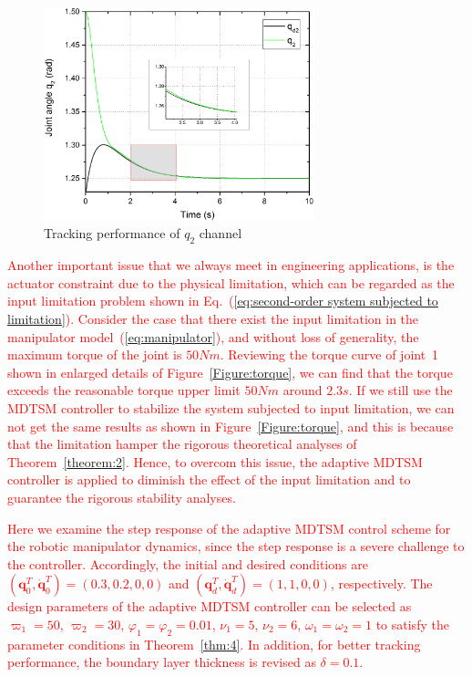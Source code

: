 \documentclass[3p]{elsarticle}
\theoremstyle{plain}
\theoremstyle{remark}
\begin{document}
\begin{figure}
\centering
\includegraphics[width=0.7\textwidth]{paper3_fig7.eps}
\caption{Tracking performance of $q_2$ channel}
\label{Figure:7}
\end{figure}
\textcolor{red}{Another important issue that we always meet in engineering applications, is the actuator constraint due to the physical limitation, which can be regarded as the input limitation problem shown in Eq.~(\ref{eq:second-order system subjected to limitation}). Consider the case that there exist the input limitation in the manipulator model~(\ref{eq:manipulator}), and without loss of generality, the maximum torque of the joint is $50Nm$. Reviewing the torque curve of joint~1  shown in enlarged details of  Figure~\ref{Figure:torque}, we can find that the torque exceeds the reasonable torque upper limit $50Nm$ around $2.3s$. If we still use the MDTSM controller to stabilize the system subjected to input limitation, we can not get the same results as shown in Figure~\ref{Figure:torque}, and this is because that the limitation hamper the rigorous theoretical analyses of Theorem~\ref{theorem:2}. Hence, to overcom this issue, the adaptive MDTSM controller is applied to diminish the effect of the input limitation and to guarantee the rigorous stability analyses.}

\textcolor{red}{Here we examine the step response of the adaptive MDTSM control scheme for the robotic manipulator dynamics, since the step response is a severe challenge to the controller. Accordingly, the initial and desired conditions are $(\bm q_0^T, \dot{\bm q}_0^T)= (0.3,0.2,0,0)$ and $({\bm q}_d^T,\dot{\bm q}_d^T)=(1,1,0,0)$, respectively. The design parameters of the adaptive MDTSM controller can be selected as $\varpi_1=50$, $\varpi_2=30$, $\varphi_1=\varphi_2=0.01$, $\nu_1 = 5$, $\nu_2=6$, $\omega_1=\omega_2=1$ to satisfy the parameter conditions in Theorem~\ref{thm:4}. In addition, for better tracking performance, the boundary layer thickness is revised as $\delta=0.1$. }
\end{document}
